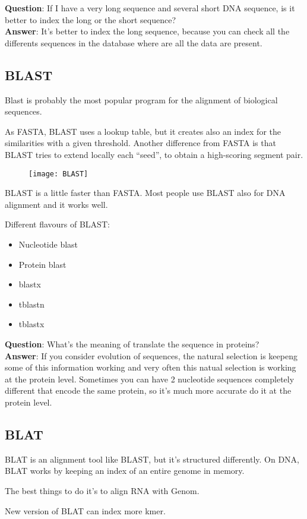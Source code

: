 \textbf{Question}: If I have a very long sequence and several short DNA
sequence, is it better to index the long or the short sequence? \\

\textbf{Answer}: It's better to index the long sequence, because you can
check all the differents sequences in the database where are all the data are
present.

\subsection{BLAST}

Blast is probably the most popular program for the alignment of biological
sequences.

As FASTA, BLAST uses a lookup table, but it creates also an index for the
similarities with a given threshold. Another difference from FASTA is that
BLAST tries to extend locally each ``seed'', to obtain a high-scoring segment
pair.

\begin{figure}[H]
  \centering
  \texttt{[image: BLAST]}
  \label{fig:blast}
\end{figure}

BLAST is a little faster than FASTA. Most people use BLAST also for DNA
alignment and it works well.

Different flavours of BLAST:
\begin{itemize}
  \item Nucleotide blast
  \item Protein blast
  \item blastx
  \item tblastn
  \item tblastx
\end{itemize}

\textbf{Question}: What's the meaning of translate the sequence in proteins? \\

\textbf{Answer}: If you consider evolution of sequences, the natural selection
is keepeng some of this information working and very often this natual
selection is working at the protein level.
Sometimes you can have 2 nucleotide sequences completely different that
encode the same protein, so it's much more accurate do it at the protein level.

\subsection{BLAT}

BLAT is an alignment tool like BLAST, but it's structured differently. On DNA,
BLAT works by keeping an index of an entire genome in memory.

The best things to do it's to align RNA with Genom.

New version of BLAT can index more kmer.
